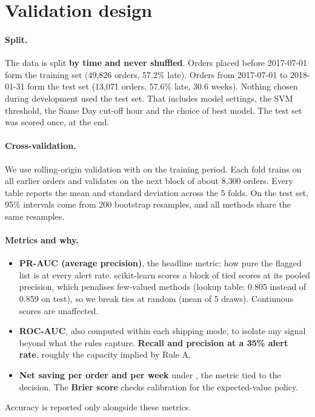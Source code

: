 \section{Validation design}
\label{sec:validation}

\paragraph{Split.} The data is split \textbf{by time and never shuffled}. Orders placed before
2017-07-01 form the training set (49{,}826 orders, 57.2\% late). Orders from 2017-07-01 to
2018-01-31 form the test set (13{,}071 orders, 57.6\% late, 30.6 weeks). Nothing chosen during
development used the test set. That includes model settings, the SVM threshold, the Same Day
cut-off hour and the choice of best model. The test set was scored once, at the end.

\paragraph{Cross-validation.} We use rolling-origin validation\cite{bergmeir2012} with
 on the training period. Each fold trains on all earlier orders and
validates on the next block of about 8{,}300 orders. Every table reports the mean and standard
deviation across the 5 folds. On the test set, 95\% intervals come from 200 bootstrap resamples,
and all methods share the same resamples.

\paragraph{Metrics and why.}
\begin{itemize}
  \item \textbf{PR-AUC (average precision)}, the headline metric: how pure the flagged list is at
        every alert rate\cite{saito2015}. scikit-learn scores a block of tied scores at its pooled
        precision, which penalises few-valued methods (lookup table: 0.805 instead of 0.859 on
        test), so we break ties at random (mean of 5 draws). Continuous scores are unaffected.
  \item \textbf{ROC-AUC}, also computed within each shipping mode, to isolate any signal beyond
        what the rules capture. \textbf{Recall and precision at a 35\% alert rate}, roughly the
        capacity implied by Rule A.
  \item \textbf{Net saving per order and per week} under , the metric tied to the
        decision. The \textbf{Brier score} checks calibration for the expected-value policy.
\end{itemize}
Accuracy is reported only alongside these metrics.

